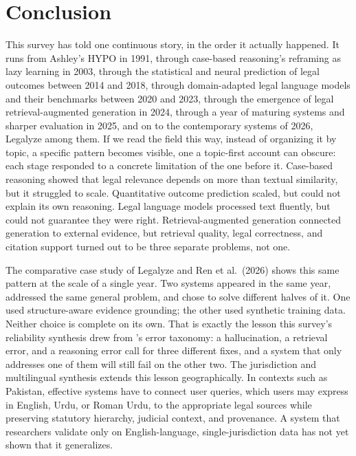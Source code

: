 \section{Conclusion}
\label{sec:conclusion}

This survey has told one continuous story, in the order it actually happened. It runs from Ashley's
HYPO in 1991, through case-based reasoning's reframing as lazy learning in 2003, through the
statistical and neural prediction of legal outcomes between 2014 and 2018, through domain-adapted
legal language models and their benchmarks between 2020 and 2023, through the emergence of legal
retrieval-augmented generation in 2024, through a year of maturing systems and sharper evaluation in
2025, and on to the contemporary systems of 2026, Legalyze among them. If we read the field this
way, instead of organizing it by topic, a specific pattern becomes visible, one a topic-first
account can obscure: each stage responded to a concrete limitation of the one before it. Case-based
reasoning showed that legal relevance depends on more than textual similarity, but it struggled to
scale. Quantitative outcome prediction scaled, but could not explain its own reasoning. Legal
language models processed text fluently, but could not guarantee they were right.
Retrieval-augmented generation connected generation to external evidence, but retrieval quality,
legal correctness, and citation support turned out to be three separate problems, not one.

The comparative case study of Legalyze and Ren et al.\ (2026) shows this same pattern at the scale
of a single year. Two systems appeared in the same year, addressed the same general problem, and
chose to solve different halves of it. One used structure-aware evidence grounding; the other used
synthetic training data. Neither choice is complete on its own. That is exactly the lesson this
survey's reliability synthesis drew from \citet{butler2026}'s error taxonomy: a hallucination, a
retrieval error, and a reasoning error call for three different fixes, and a system that only
addresses one of them will still fail on the other two. The jurisdiction and multilingual synthesis
extends this lesson geographically. In contexts such as Pakistan, effective systems have to connect
user queries, which users may express in English, Urdu, or Roman Urdu, to the appropriate legal
sources while preserving statutory hierarchy, judicial context, and provenance. A system that
researchers validate only on English-language, single-jurisdiction data has not yet shown that it
generalizes.

